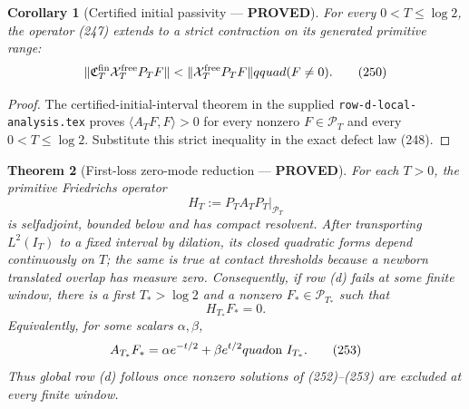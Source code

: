 \documentclass[11pt]{article}
\newtheorem{theorem}{Theorem}
\newtheorem{corollary}[theorem]{Corollary}
\newcommand{\PROVED}{\textcolor{green!45!black}{\textbf{PROVED}}}
\begin{document}
\begin{corollary}[Certified initial passivity --- \PROVED]
For every $0<T\le\log2$, the operator (247) extends to a strict contraction
on its generated primitive range:
\begin{equation}
 \|\mathfrak C_T^{\rm fin}
       \mathcal X_T^{\rm free}P_TF\|
 <\|\mathcal X_T^{\rm free}P_TF\|qquad(F\ne0).       \tag{250}
\end{equation}
\end{corollary}

\begin{proof}
The certified-initial-interval theorem in the supplied
\texttt{row-d-local-analysis.tex} proves
$\langle A_TF,F\rangle>0$ for every nonzero $F\in\mathcal P_T$ and every
$0<T\le\log2$.  Substitute this strict inequality in the exact defect law
(248).
\end{proof}

\begin{theorem}[First-loss zero-mode reduction --- \PROVED]
For each $T>0$, the primitive Friedrichs operator
\begin{equation}
 H_T:=P_TA_TP_T\big|_{\mathcal P_T}                  \tag{251}
\end{equation}
is selfadjoint, bounded below and has compact resolvent.  After transporting
$L^2(I_T)$ to a fixed interval by dilation, its closed quadratic forms depend
continuously on $T$; the same is true at contact thresholds because a newborn
translated overlap has measure zero.  Consequently, if row (d) fails at some
finite window, there is a first $T_*>\log2$ and a nonzero
$F_*\in\mathcal P_{T_*}$ such that
\begin{equation}
 H_{T_*}F_*=0.                                        \tag{252}
\end{equation}
Equivalently, for some scalars $\alpha,\beta$,
\begin{equation}
 A_{T_*}F_*
 =\alpha e^{-t/2}+\beta e^{t/2}quad\hbox{on }I_{T_*}. \tag{253}
\end{equation}
Thus global row (d) follows once nonzero solutions of (252)--(253) are
excluded at every finite window.
\end{theorem}
\end{document}
